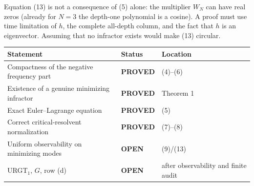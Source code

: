 \documentclass[11pt]{article}
\newcommand{\PROVED}{\textcolor{green!40!black}{\textbf{PROVED}}}
\newcommand{\OPEN}{\textcolor{red!70!black}{\textbf{OPEN}}}
\begin{document}
Equation (13) is not a consequence of (5) alone: the multiplier $W_N$ can
have real zeros (already for $N=3$ the depth-one polynomial is a cosine).
A proof must use time limitation of $h$, the complete all-depth column,
and the fact that $h$ is an eigenvector.  Assuming that no infractor exists
would make (13) circular.

\begin{center}
\begin{tabular}{>{\raggedright\arraybackslash}p{.58\linewidth}
                >{\centering\arraybackslash}p{.14\linewidth}
                >{\raggedright\arraybackslash}p{.18\linewidth}}
\toprule
Statement & Status & Location \\
\midrule
Compactness of the negative frequency part & \PROVED & (4)--(6) \\
Existence of a genuine minimizing infractor & \PROVED & Theorem 1 \\
Exact Euler--Lagrange equation & \PROVED & (5) \\
Correct critical-resolvent normalization & \PROVED & (7)--(8) \\
Uniform observability on minimizing modes & \OPEN & (9)/(13) \\
URGT$_1$, $G$, row (d) & \OPEN & after observability and finite audit \\
\bottomrule
\end{tabular}
\end{center}
\end{document}
